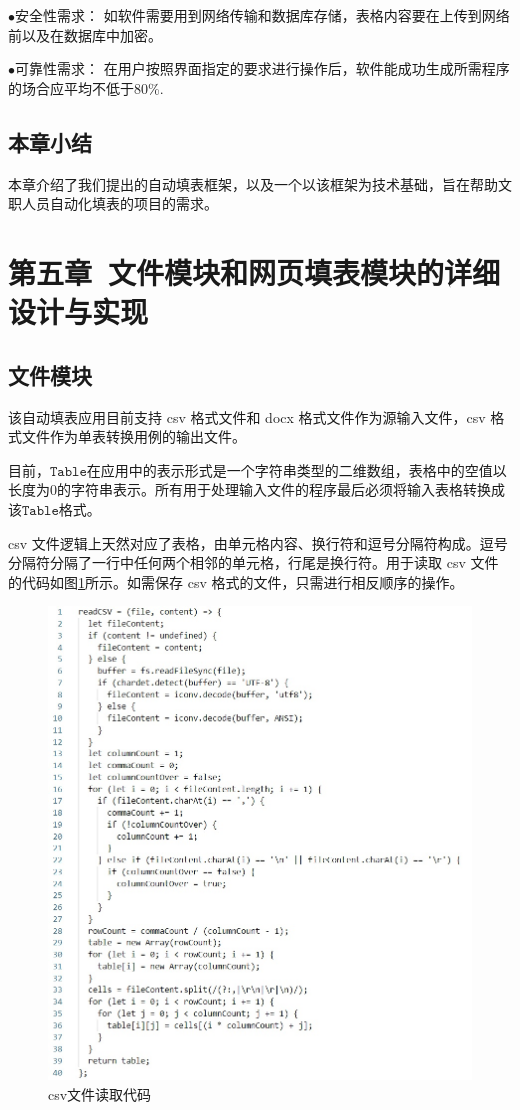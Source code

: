 \documentclass[design, pageheader]{njubachelor}
\begin{document}
$\bullet$安全性需求：
如软件需要用到网络传输和数据库存储，表格内容要在上传到网络前以及在数据库中加密。

$\bullet$可靠性需求：
在用户按照界面指定的要求进行操作后，软件能成功生成所需程序的场合应平均不低于80\%.

\subsection{本章小结}
本章介绍了我们提出的自动填表框架，以及一个以该框架为技术基础，旨在帮助文职人员自动化填表的项目的需求。

\section{第五章~文件模块和网页填表模块的详细设计与实现}
\subsection{文件模块}
该自动填表应用目前支持 csv 格式文件和 docx 格式文件作为源输入文件，csv 格式文件作为单表转换用例的输出文件。

目前，$\mathtt{Table}$在应用中的表示形式是一个字符串类型的二维数组，表格中的空值以长度为0的字符串表示。所有用于处理输入文件的程序最后必须将输入表格转换成该$\mathtt{Table}$格式。

csv 文件逻辑上天然对应了表格，由单元格内容、换行符和逗号分隔符构成。逗号分隔符分隔了一行中任何两个相邻的单元格，行尾是换行符。用于读取 csv 文件的代码如图\ref{fig:csv}所示。如需保存 csv 格式的文件，只需进行相反顺序的操作。
\begin{figure}
    \centering
    \includegraphics[width=15cm,keepaspectratio]{figures/csv.jpg}
    \caption{csv文件读取代码}
    \label{fig:csv}
\end{figure}
\end{document}
